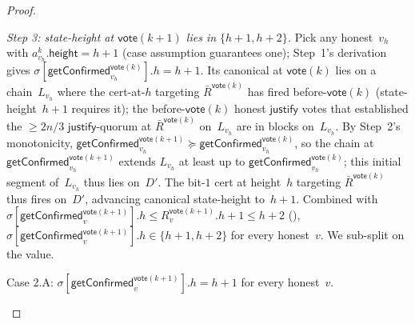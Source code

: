 \documentclass{article}
\newcommand{\height}{\mathsf{height}}
\newcommand{\just}{\ensuremath{\mathsf{justify}}\xspace}
\newcommand{\vote}{\mathsf{vote}}
\newcommand{\comm}[1]{\bar{#1}}
\newcommand{\getConfirmed}{\textsf{getConfirmed}\xspace}
\theoremstyle{plain}
\theoremstyle{definition}
\theoremstyle{remark}
\begin{document}
\begin{proof}
\begin{description}
\emph{Step 3: state-height at $\vote(k+1)$ lies in $\{h+1, h+2\}$.}
Pick any honest~$v_h$ with $a^k_{v_h}.\height = h+1$ (case assumption guarantees one); Step~1's derivation gives $\sigma[\getConfirmed_{v_h}^{\vote(k)}].h = h+1$. Its canonical at $\vote(k)$ lies on a chain~$L_{v_h}$ where the cert-at-$h$ targeting $\comm{R}^{\vote(k)}$ has fired before-$\vote(k)$ (state-height~$h+1$ requires it); the before-$\vote(k)$ honest \just votes that established the $\geq 2n/3$ \just-quorum at $\comm{R}^{\vote(k)}$ on~$L_{v_h}$ are in blocks on~$L_{v_h}$. By Step~2's monotonicity, $\getConfirmed_{v_h}^{\vote(k+1)} \succeq \getConfirmed_{v_h}^{\vote(k)}$, so the chain at $\getConfirmed_{v_h}^{\vote(k+1)}$ extends $L_{v_h}$ at least up to $\getConfirmed_{v_h}^{\vote(k)}$; this initial segment of~$L_{v_h}$ thus lies on~$D'$. The bit-$1$ cert at height~$h$ targeting $\comm{R}^{\vote(k)}$ thus fires on~$D'$, advancing canonical state-height to~$h+1$. Combined with $\sigma[\getConfirmed_v^{\vote(k+1)}].h \leq R_v^{\vote(k+1)}.h + 1 \leq h+2$ (), $\sigma[\getConfirmed_v^{\vote(k+1)}].h \in \{h+1, h+2\}$ for every honest~$v$. We sub-split on the value.

\begin{description}
\item[{Case 2.A: $\sigma[\getConfirmed_v^{\vote(k+1)}].h = h+1$ for every honest~$v$.}]\hfill

\begin{figure}[H]
\centering
{}
\end{figure}
\end{description}
\end{description}
\end{proof}
\end{document}
